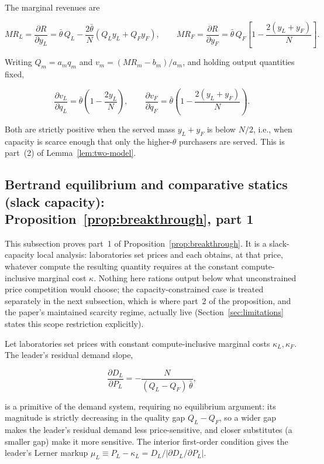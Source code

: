 \documentclass[11pt]{article}
\begin{document}
The marginal revenues are

\begin{equation}MR_L=\frac{\partial R}{\partial y_L}=\bar\theta\,Q_L-\frac{2\bar\theta}{N}\left(Q_L y_L+Q_F y_F\right),\qquad MR_F=\frac{\partial R}{\partial y_F}=\bar\theta\,Q_F\left[1-\frac{2(y_L+y_F)}{N}\right].\end{equation}

Writing $Q_m=a_m q_m$ and $v_m=(MR_m-b_m)/a_m$, and holding output quantities fixed,

\begin{equation}\frac{\partial v_L}{\partial q_L}=\bar\theta\left(1-\frac{2y_L}{N}\right),\qquad \frac{\partial v_F}{\partial q_F}=\bar\theta\left(1-\frac{2(y_L+y_F)}{N}\right).\end{equation}

Both are strictly positive when the served mass $y_L+y_F$ is below $N/2$, i.e., when capacity is scarce enough that only the higher-$\theta$ purchasers are served. This is part~(2) of Lemma~\ref{lem:two-model}.

\subsection{Bertrand equilibrium and comparative statics (slack capacity): Proposition~\ref{prop:breakthrough}, part 1}
\label{subsec:app-bertrand}

This subsection proves part~1 of Proposition~\ref{prop:breakthrough}. It is a slack-capacity local analysis: laboratories set prices and each obtains, at that price, whatever compute the resulting quantity requires at the constant compute-inclusive marginal cost $\kappa$. Nothing here rations output below what unconstrained price competition would choose; the capacity-constrained case is treated separately in the next subsection, which is where part~2 of the proposition, and the paper's maintained scarcity regime, actually live (Section~\ref{sec:limitations} states this scope restriction explicitly).

Let laboratories set prices with constant compute-inclusive marginal costs $\kappa_L,\kappa_F$. The leader's residual demand slope,

\begin{equation}\frac{\partial D_L}{\partial P_L}=-\frac{N}{(Q_L-Q_F)\,\bar\theta},\end{equation}

is a primitive of the demand system, requiring no equilibrium argument: its magnitude is strictly decreasing in the quality gap $Q_L-Q_F$, so a wider gap makes the leader's residual demand less price-sensitive, and closer substitutes (a smaller gap) make it more sensitive. The interior first-order condition gives the leader's Lerner markup $\mu_L\equiv P_L-\kappa_L=D_L\big/\lvert\partial D_L/\partial P_L\rvert$.
\end{document}
